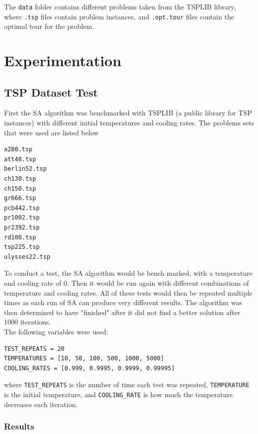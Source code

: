 \documentclass{article}
\begin{document}
The \texttt{data} folder contains different problems taken from the TSPLIB library, where \texttt{.tsp} files contain problem instances, and \texttt{.opt.tour} files contain the optimal tour for the problem.

\newpage
\section{Experimentation}

\subsection{TSP Dataset Test}
First the SA algorithm was benchmarked with TSPLIB \cite{tsplib} (a public library for TSP instances) with different initial temperatures and cooling rates.
The problems sets that were used are listed below

\begin{multicols}{6}
\begin{verbatim}
a280.tsp
att48.tsp
berlin52.tsp
ch130.tsp
ch150.tsp
gr666.tsp
pcb442.tsp
pr1002.tsp
pr2392.tsp
rd100.tsp
tsp225.tsp
ulysses22.tsp
\end{verbatim}
\end{multicols}

To conduct a test, the SA algorithm would be bench marked, with a temperature and cooling rate of 0.
Then it would be run again with different combinations of temperature and cooling rates.
All of these tests would then be repeated multiple times as each run of SA can produce very different results.
The algorithm was then determined to have "finished" after it did not find a better solution after 1000 iterations.
\\

The following variables were used:

\begin{verbatim}
TEST_REPEATS = 20
TEMPERATURES = [10, 50, 100, 500, 1000, 5000]
COOLING_RATES = [0.999, 0.9995, 0.9999, 0.99995]
\end{verbatim}

where \texttt{TEST\_REPEATS} is the number of time each test was repeated, \texttt{TEMPERATURE} is the initial temperature, and \texttt{COOLING\_RATE} is how much the temperature decreases each iteration.

\subsubsection{Results}
\end{document}
